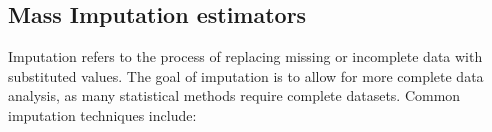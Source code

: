 \documentclass[
]{jss}
\begin{document}
\begin{table}
\centering
\captionsetup{aboveskip=0pt, belowskip=0pt} %
\scriptsize %
\setlength{\tabcolsep}{3pt} %
\renewcommand{\arraystretch}{0.8} %
\caption{Two Sample Setting}
\label{tab:tabela1_1}
\end{table}

\subsection{Mass Imputation
estimators}\label{mass-imputation-estimators}

Imputation refers to the process of replacing missing or incomplete data
with substituted values. The goal of imputation is to allow for more
complete data analysis, as many statistical methods require complete
datasets. Common imputation techniques include:
\end{document}
